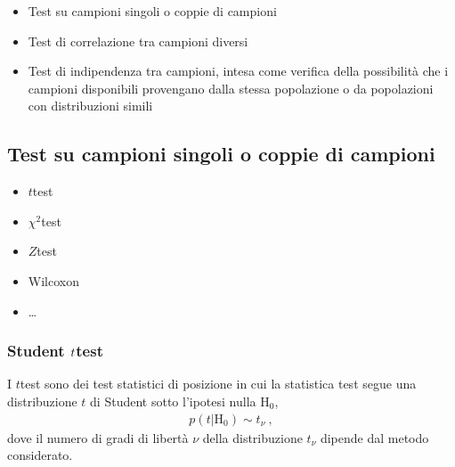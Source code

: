 \documentclass[letterpaper,10pt,italian]{jupyterBook}
\begin{document}
\sphinxAtStartPar
{}
\begin{itemize}
\item {} 
\sphinxAtStartPar
Test su campioni singoli o coppie di campioni

\item {} 
\sphinxAtStartPar
Test di correlazione tra campioni diversi

\item {} 
\sphinxAtStartPar
Test di indipendenza tra campioni, intesa come verifica della possibilità che i campioni disponibili provengano dalla stessa popolazione o da popolazioni con distribuzioni simili

\end{itemize}





\sphinxstepscope


\subsection{Test su campioni singoli o coppie di campioni}
\label{\detokenize{ch/statistics/hp-test-single:test-su-campioni-singoli-o-coppie-di-campioni}}\label{\detokenize{ch/statistics/hp-test-single:hp-test-single}}\label{\detokenize{ch/statistics/hp-test-single::doc}}
\sphinxAtStartPar
{}
\begin{itemize}
\item {} 
\sphinxAtStartPar
\(t\)\sphinxhyphen{}test

\item {} 
\sphinxAtStartPar
\(\chi^2\)\sphinxhyphen{}test

\item {} 
\sphinxAtStartPar
\(Z\)\sphinxhyphen{}test

\item {} 
\sphinxAtStartPar
Wilcoxon

\item {} 
\sphinxAtStartPar
…

\end{itemize}


\subsubsection{Student \protect\(t\protect\)\sphinxhyphen{}test}
\label{\detokenize{ch/statistics/hp-test-single:student-t-test}}\label{\detokenize{ch/statistics/hp-test-single:hp-test-t-tests}}
\sphinxAtStartPar
I \(t\)\sphinxhyphen{}test sono dei test statistici di posizione in cui la statistica test segue una distribuzione \(t\) di Student sotto l’ipotesi nulla \(\text{H}_0\),
\begin{equation*}
\begin{split}p(t|\text{H}_0) \sim t_{\nu} \ ,\end{split}
\end{equation*}
\sphinxAtStartPar
dove il numero di gradi di libertà \(\nu\) della distribuzione \(t_{\nu}\) dipende dal metodo considerato.
\end{document}
